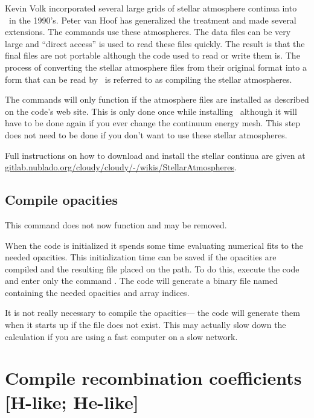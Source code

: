 Kevin Volk incorporated several large grids of stellar atmosphere
continua
into \Cloudy\ in the 1990's.
Peter van Hoof has generalized the treatment
and made several extensions.
The  commands use these atmospheres.
The data files can be very large and ``direct access'' is used to read these
files quickly.
The result is that the final files are not portable although
the code used to read or write them is.
The process of converting the
stellar atmosphere files from their original format into a form that can
be read by \Cloudy\ is referred to as compiling the stellar atmospheres.

The  commands will only function
if the atmosphere files
are installed as described on the code's web site.
This is only done once
while installing \Cloudy\ although it will have to be
done again if you ever
change the continuum energy mesh.
This step does not need to be done if
you don't want to use these stellar atmospheres.

Full instructions on how to download and install the stellar continua
are given at
\href{https://gitlab.nublado.org/cloudy/cloudy/-/wikis/StellarAtmospheres}{gitlab.nublado.org/cloudy/cloudy/-/wikis/StellarAtmospheres}.

\begin{shaded}
\section{Compile opacities}

 This command does not now function and may be removed.

When the code is initialized it spends some time evaluating numerical
fits to the needed opacities.
This initialization time can be saved if
the opacities are compiled and the resulting file placed on the path.
To
do this, execute the code and enter only the command
.
The code will generate a binary file named 
containing the needed opacities and array indices.

  It is not really necessary to compile the opacities---
the code
will generate them when it starts up if the file does not exist.
This may
actually slow down the calculation if you are using a fast computer on a
slow network.
\end{shaded}

\section{Compile recombination coefficients [H-like; He-like]}

